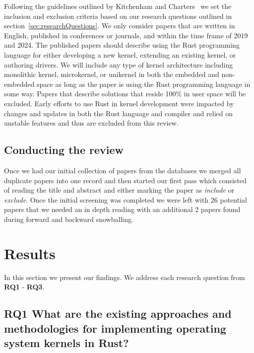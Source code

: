 \documentclass[sigconf]{acmart}
\begin{document}
Following the guidelines outlined by Kitchenham and Charters~\cite{Stuart2007-cc} we set the
inclusion and exclusion criteria based on our research questions outlined in
section~\ref{sec:researchQuestions}. We only consider papers that are written in English, published
in conferences or journals, and within the time frame of 2019 and 2024. The published papers should
describe using the Rust programming language for either developing a new kernel, extending an
existing kernel, or authoring drivers. We will include any type of kernel architecture including
monolithic kernel, microkernel, or unikernel in both the embedded and non-embedded space as long as
the paper is using the Rust programming language in some way. Papers that describe solutions that
reside 100\% in user space will be excluded. Early efforts to use Rust in kernel development
were impacted by changes and updates in both the Rust language and compiler and relied on unstable
features and thus are excluded from this review.

\subsection{Conducting the review}

Once we had our initial collection of papers from the databases we merged all duplicate papers into
one record and then started our first pass which consisted of reading the title and abstract and
either marking the paper as \textit{include} or \textit{exclude}. Once the initial screening was
completed we were left with 26 potential papers that we needed an in depth reading with an
additional 2 papers found during forward and backward snowballing.

\section{Results}

In this section we present our findings. We address each research question from \textbf{RQ1} - \textbf{RQ3}.

\subsection{RQ1 What are the existing approaches and methodologies for implementing operating system kernels in Rust?}
\end{document}
